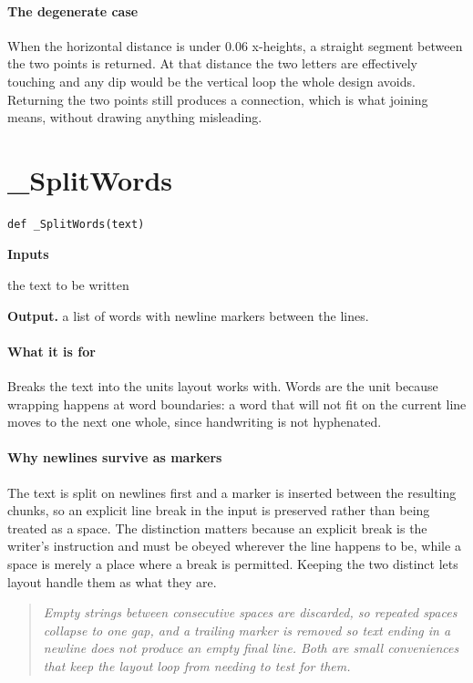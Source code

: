 \paragraph{The degenerate case}
When the horizontal distance is under 0.06 x-heights, a straight segment between the two points is returned. At that distance the two letters are effectively touching and any dip would be the vertical loop the whole design avoids. Returning the two points still produces a connection, which is what joining means, without drawing anything misleading.


\section{\_SplitWords}
\begin{lstlisting}[style=sig]
def _SplitWords(text)
\end{lstlisting}

\noindent\textbf{Inputs}
\begin{description}[leftmargin=2.2em,style=nextline,font=\normalfont\ttfamily]\setlength\itemsep{1pt}
  \item[{text}] \normalfont the text to be written
\end{description}

\noindent\textbf{Output.} a list of words with newline markers between the lines.


\paragraph{What it is for}
Breaks the text into the units layout works with. Words are the unit because wrapping happens at word boundaries: a word that will not fit on the current line moves to the next one whole, since handwriting is not hyphenated.


\paragraph{Why newlines survive as markers}
The text is split on newlines first and a marker is inserted between the resulting chunks, so an explicit line break in the input is preserved rather than being treated as a space. The distinction matters because an explicit break is the writer's instruction and must be obeyed wherever the line happens to be, while a space is merely a place where a break is permitted. Keeping the two distinct lets layout handle them as what they are.


\begin{quote}\small\itshape Empty strings between consecutive spaces are discarded, so repeated spaces collapse to one gap, and a trailing marker is removed so text ending in a newline does not produce an empty final line. Both are small conveniences that keep the layout loop from needing to test for them.\end{quote}

